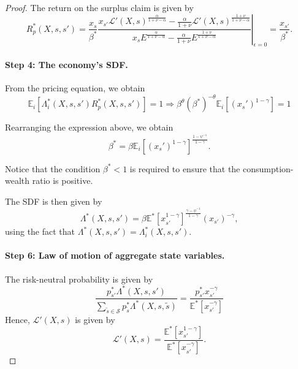 \begin{proof}
The return on the surplus claim is given by
\begin{equation}
    R_p^*(X,s,s') = \left.\frac{x_{s}}{\beta^*} \frac{x_{s'} \mathcal{L}'(X,s)^\frac{\alpha}{1+\nu-\alpha} -\frac{ \alpha}{1+\nu} \mathcal{L}'(X,s)^{\frac{1+\nu}{1+\nu-\alpha}}}{x_{s} E^\frac{\alpha}{1+\nu-\alpha} -\frac{ \alpha}{1+\nu} E^{\frac{1+\nu}{1+\nu-\alpha}}} \right|_{\epsilon =0} = \frac{x_{s'}}{\beta^*}.
\end{equation}

\paragraph{Step 4: The economy's SDF.}
From the pricing equation, we obtain
\begin{equation}
    \mathbb{E}_i[\Lambda_i^*(X,s,s') R^*_p(X,s,s')] = 1 \Rightarrow \beta^\theta (\beta^*)^{-\theta} \mathbb{E}_i[(x_s')^{1-\gamma}] =1
\end{equation}

Rearranging the expression above, we obtain
\begin{equation}
    \beta^* = \beta \mathbb{E}_i[(x_s')^{1-\gamma}]^{\frac{1-\psi^{-1}}{1-\gamma}}.
\end{equation}

Notice that the condition $\beta^* < 1$ is required to ensure that the consumption-wealth ratio is positive.

The SDF is then given by
\begin{equation}
    \Lambda^*(X,s,s') = \beta \mathbb{E}^*[ x_{s'}^{1-\gamma} ]^{\frac{\gamma - \psi^{-1}}{1-\gamma}} (x_{s'})^{-\gamma},
\end{equation}
using the fact that $\Lambda^*(X,s,s') = \Lambda_i^*(X,s,s')$.

\paragraph{Step 6: Law of motion of aggregate state variables.} The risk-neutral probability is given by
\begin{equation}
    \frac{p_{s'}^* \Lambda^*(X,s,s')}{\sum_{\tilde{s}\in\mathcal{S}} p_{\tilde{s}}^* \Lambda^*(X,s,\tilde{s})} = \frac{p_{s'}^* x_{s'}^{-\gamma}}{\mathbb{E}^*[x_{s'}^{-\gamma}]}
\end{equation}
Hence, $\mathcal{L}'(X,s)$ is given by
\begin{equation}
    \mathcal{L}'(X,s) = \frac{\mathbb{E}^*[x_{s'}^{1-\gamma}]}{\mathbb{E}^*[x_{s'}^{-\gamma}]}.
\end{equation}


\end{proof}
